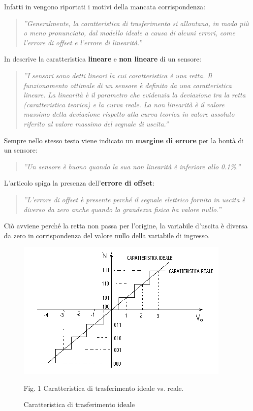 \documentclass[a4paper]{report} %
\begin{document}
Infatti in \cite{art:rif.1} vengono riportati i motivi della mancata corrispondenza:
\begin{quote} 
	\textit{''Generalmente, la caratteristica di trasferimento si allontana, in modo più o meno pronunciato, dal modello ideale a causa di alcuni errori, come l'errore di offset e l'errore di linearità.''}
\end{quote}


In \cite{art:rif.11} descrive la caratteristica \textbf{lineare} e \textbf{non lineare} di un sensore:
\begin{quote}
	\textit{''I sensori sono detti lineari la cui caratteristica è una retta. Il funzionamento ottimale di un sensore è definito da una caratteristica lineare. La linearità è il parametro che evidenzia la deviazione tra la retta (caratteristica teorica) e la curva reale. 
	La non linearità è il valore massimo della deviazione rispetto alla curva teorica in valore assoluto riferito al valore massimo del segnale di uscita.''}
\end{quote} 
Sempre nello stesso testo viene indicato un \textbf{margine di errore} per la bontà di un sensore:	
\begin{quote}
	\textit{''Un sensore è buono quando la sua non linearità è inferiore allo 0.1\%.''}
\end{quote}

L'articolo \cite{art:rif.1} spiga la presenza dell'\textbf{errore di offset}:
\begin{quote} 
	\textit{''L'errore di offset è presente perché il segnale elettrico fornito in uscita è diverso da zero anche quando la grandezza fisica ha valore nullo.''} 
\end{quote} 	
Ciò avviene perché la retta non passa per l'origine, la variabile d'uscita è diversa da zero in corrispondenza del valore nullo della variabile di ingresso. 

\begin{figure}
	\centering
	\includegraphics[scale=.8]{Immagini/CarTrasferimento.png}
	
	Fig. 1 Caratteristica di trasferimento ideale vs. reale. \cite{art:rif.19}
	\caption{Caratteristica di trasferimento ideale}
	\label{fig:car}
\end{figure}
\end{document}
